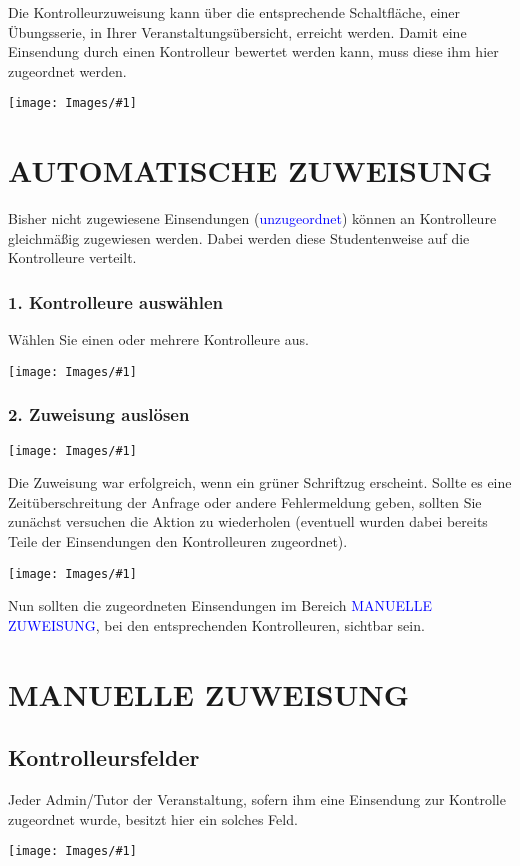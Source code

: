 \documentclass[a4paper,final]{scrartcl}
\title
{}
\author 
{}
\date{\vspace{12cm}\monthword{\the\month}\space\the\year}
\subtitle
{}
\numberwithin{equation}{section}
\newcommand{\blau}[1]{\textcolor{blue}{#1}}
\newenvironment{Bilder}
  {\par\raggedbottom\null\noindent\minipage{\textwidth}\centering}
  {\endminipage\vspace{0.7cm}}
\newcommand{\tbild}[1]{%
\begin{Bilder}
 \texttt{[image: Images/\#1]}
	\end{Bilder}
}
\begin{document}
Die Kontrolleurzuweisung kann über die entsprechende Schaltfläche, einer Übungsserie, in Ihrer Veranstaltungsübersicht, erreicht werden. Damit eine Einsendung durch einen Kontrolleur bewertet werden kann, muss diese ihm hier zugeordnet werden.
\tbild{pathA}

\pagestyle{seite}
\section{AUTOMATISCHE ZUWEISUNG}
Bisher nicht zugewiesene Einsendungen (\blau{unzugeordnet}) können an Kontrolleure gleichmäßig zugewiesen werden. Dabei werden diese Studentenweise auf die Kontrolleure verteilt.

\subsubsection*{1. Kontrolleure auswählen}
Wählen Sie einen oder mehrere Kontrolleure aus.
\tbild{autoA.png}
\subsubsection*{2. Zuweisung auslösen}
\tbild{autoB.png}
Die Zuweisung war erfolgreich, wenn ein grüner Schriftzug erscheint. Sollte es eine Zeitüberschreitung der Anfrage oder andere Fehlermeldung geben, sollten Sie zunächst versuchen die Aktion zu wiederholen (eventuell wurden dabei bereits Teile der Einsendungen den Kontrolleuren zugeordnet).
\tbild{autoC.png}
Nun sollten die zugeordneten Einsendungen im Bereich \blau{MANUELLE ZUWEISUNG}, bei den entsprechenden Kontrolleuren, sichtbar sein.

\newpage
\section{MANUELLE ZUWEISUNG}
\subsection{Kontrolleursfelder}
Jeder Admin/Tutor der Veranstaltung, sofern ihm eine Einsendung zur Kontrolle zugeordnet wurde, besitzt hier ein solches Feld.
\tbild{manF.png}
\end{document}
